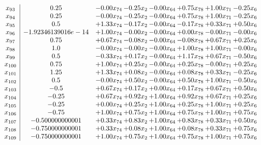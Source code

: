 \documentclass[8pt]{article}
\begin{document}
\[\begin{array}{c| c c@{\hskip 2pt} c@{\hskip 2pt} c@{\hskip 2pt} c@{\hskip 2pt} c@{\hskip 2pt} c@{\hskip 2pt} }
 x_{93}   &  0.25 & -0.00 x_{74} & -0.25 x_{2} & -0.00 x_{64} & +  0.75 x_{78} & +  1.00 x_{71} & -0.25 x_{6}\\
 x_{94}   &  0.25 & -0.00 x_{74} & -0.25 x_{2} & -0.00 x_{64} & +  0.75 x_{78} & +  1.00 x_{71} & -0.25 x_{6}\\
 x_{95}   &  0.5 & +  1.33 x_{74} & -0.17 x_{2} & -0.00 x_{64} & -0.17 x_{78} & +  0.33 x_{71} & +  0.50 x_{6}\\
 x_{96}   &  -1.92346139016e-14 & +  1.00 x_{74} & -0.00 x_{2} & -0.00 x_{64} & +  0.00 x_{78} & -0.00 x_{71} & -0.00 x_{6}\\
 x_{97}   &  0.75 & +  0.67 x_{74} & -0.08 x_{2} & -0.00 x_{64} & -0.08 x_{78} & +  0.67 x_{71} & +  0.25 x_{6}\\
 x_{98}   &  1.0 & -0.00 x_{74} & -0.00 x_{2} & -0.00 x_{64} & +  1.00 x_{78} & +  1.00 x_{71} & -0.00 x_{6}\\
 x_{99}   &  0.5 & -0.33 x_{74} & +  0.17 x_{2} & -0.00 x_{64} & +  1.17 x_{78} & +  0.67 x_{71} & -0.50 x_{6}\\
 x_{100}   &  0.75 & +  1.00 x_{74} & +  0.25 x_{2} & -0.00 x_{64} & +  0.25 x_{78} & -0.00 x_{71} & +  0.25 x_{6}\\
 x_{101}   &  1.25 & +  1.33 x_{74} & +  0.08 x_{2} & -0.00 x_{64} & +  0.08 x_{78} & +  0.33 x_{71} & -0.25 x_{6}\\
 x_{102}   &  0.5 & -0.00 x_{74} & +  0.50 x_{2} & -0.00 x_{64} & +  0.50 x_{78} & +  1.00 x_{71} & -0.50 x_{6}\\
 x_{103}   &  -0.5 & +  0.67 x_{74} & +  0.17 x_{2} & +  0.00 x_{64} & +  0.17 x_{78} & +  0.67 x_{71} & +  0.50 x_{6}\\
 x_{104}   &  -0.25 & +  0.67 x_{74} & +  0.92 x_{2} & +  1.00 x_{64} & +  0.92 x_{78} & +  0.67 x_{71} & +  0.25 x_{6}\\
 x_{105}   &  -0.25 & +  0.00 x_{74} & +  0.25 x_{2} & +  1.00 x_{64} & +  0.25 x_{78} & +  1.00 x_{71} & +  0.25 x_{6}\\
 x_{106}   &  -0.75 & +  1.00 x_{74} & +  0.75 x_{2} & +  1.00 x_{64} & +  0.75 x_{78} & +  1.00 x_{71} & +  0.75 x_{6}\\
 x_{107}   &  -0.500000000001 & +  0.33 x_{74} & +  0.83 x_{2} & +  1.00 x_{64} & +  0.83 x_{78} & +  0.33 x_{71} & +  0.50 x_{6}\\
 x_{108}   &  -0.750000000001 & +  0.33 x_{74} & +  0.08 x_{2} & +  1.00 x_{64} & +  0.08 x_{78} & +  0.33 x_{71} & +  0.75 x_{6}\\
 x_{109}   &  -0.750000000001 & +  1.00 x_{74} & +  0.75 x_{2} & +  1.00 x_{64} & +  0.75 x_{78} & +  1.00 x_{71} & +  0.75 x_{6}\\

\end{array}\]
\end{document}
